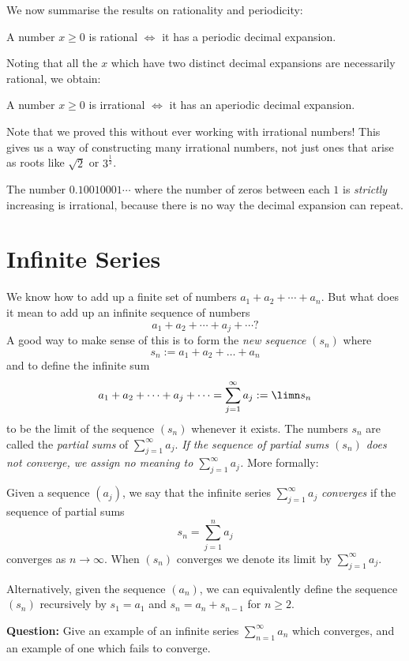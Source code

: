 \documentclass[11pt,dvipsnames]{book}
\numberwithin{figure}{section} %
\numberwithin{table}{section} %
\begin{document}
We now summarise the results on rationality and periodicity:
\begin{theorem}\label{87}
A number $x  \geq 0$ is rational $\iff$ it has a periodic decimal expansion.
\end{theorem}
Noting that all the $x$ which have two distinct decimal expansions are necessarily rational, we obtain:
\begin{corollary}\label{88}
A number $x  \geq 0$ is irrational $\iff$ it has an aperiodic decimal expansion.
\end{corollary}
Note that we proved this without ever working with irrational numbers! This gives us a way of constructing many irrational numbers, not just ones that arise as roots like $\sqrt{2}$ or $3^{\frac{1}{2}}$.

\begin{example}
The number $0.10010001\cdots $ where the number of zeros between each $1$ is {\em strictly} increasing is irrational, because there is no way the decimal expansion can repeat.
\end{example}

\section{Infinite Series}
We know how to add up a finite set of numbers $a_1 + a_2 + \cdots + a_n$. But what does it mean to add up an infinite sequence of numbers
\[ a_1 + a_2 + \cdots + a_j + \cdots ?\]
A good way to make sense of this is to form the {\em new sequence} $(s_n)$ where
\[ s_n := a_1 + a_2 + \dots + a_n\]
and to define the infinite sum
$$a_1 + a_2 + \cdots + a_j + \cdots = \sum_{j=1}^\infty a_j := \limn s_n$$
to be the limit of the sequence $(s_n)$ whenever it exists. The numbers $s_n$ are called the {\em partial sums} of $\sum_{j=1}^\infty a_j$. {\em If the sequence of partial sums $(s_n)$ does not converge, we assign no meaning to $\sum_{j=1}^\infty a_j$.} More formally:
\begin{definition}
Given a sequence $(a_{j})$, we say that the infinite series $\sum_{j=1}^\infty a_{j}$ {\it converges} if the sequence of partial sums
\[
s_{n}=\sum_{j=1}^{n}a_{j}
\]
converges as $n\rightarrow\infty$. When $(s_n)$ converges we denote its limit by $\sum_{j=1}^{\infty}a_{j}$.
\end{definition}
Alternatively, given the sequence $(a_n)$, we can equivalently define the sequence $(s_n)$ recursively by
$s_1 = a_1$ and
$s_{n} = a_n + s_{n-1}$
for $n \geq 2$.

\medskip
\noindent
{\bf Question:} Give an example of an infinite series $\sum_{n=1}^\infty a_n$ which converges, and an example of one which fails to converge.
\end{document}
